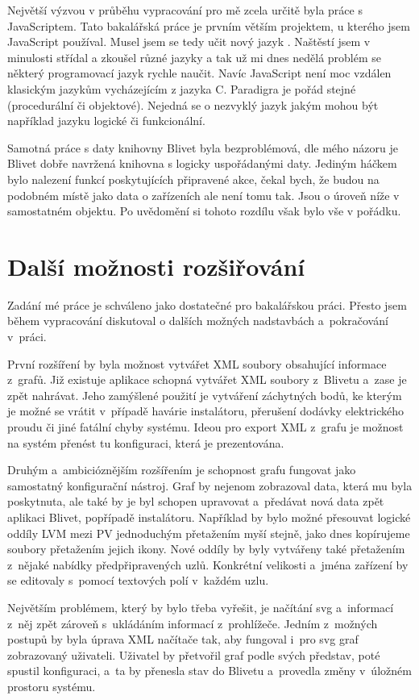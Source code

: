 \documentclass[color,table,oneside,nolot,nolof]{fithesis}
\begin{document}
	Největší výzvou v průběhu vypracování pro mě zcela určitě byla práce s JavaScriptem. Tato bakalářská práce je prvním větším projektem, u kterého jsem JavaScript používal. Musel jsem se
	tedy učit nový jazyk . Naštěstí jsem v minulosti střídal a zkoušel různé jazyky a tak už mi dnes nedělá problém se některý programovací jazyk rychle naučit. Navíc 
	JavaScript není moc vzdálen klasickým jazykům vycházejícím z jazyka C. Paradigra je pořád stejné (procedurální či objektové). Nejedná se o nezvyklý jazyk jakým mohou být například
	jazyku logické či funkcionální.

	Samotná práce s daty knihovny Blivet byla bezproblémová, dle mého názoru je Blivet dobře navržená knihovna s logicky uspořádanými daty. Jediným háčkem bylo nalezení funkcí poskytujících
	připravené akce, čekal bych, že budou na podobném místě jako data o zařízeních ale není tomu tak. Jsou o úroveň níže v samostatném objektu. Po uvědomění si tohoto rozdílu však bylo vše
	v pořádku.
  
\section{Další možnosti rozšiřování}
	Zadání mé práce je schváleno jako dostatečné pro bakalářskou práci. Přesto jsem během vypracování diskutoval o dalších možných nadstavbách a~pokračování v~práci.

	První rozšíření by byla možnost vytvářet XML soubory obsahující informace z~grafů. Již existuje aplikace schopná vytvářet XML soubory z~Blivetu a~zase je zpět nahrávat. Jeho zamýšlené
	použití je vytváření záchytných bodů, ke kterým je možné se vrátit v~případě havárie instalátoru, přerušení dodávky elektrického proudu či jiné fatální chyby systému. Ideou pro export
	XML z~grafu je možnost na systém přenést tu konfiguraci, která je prezentována.

	Druhým a~ambicióznějším rozšířením je schopnost grafu fungovat jako samostatný konfigurační nástroj. Graf by nejenom zobrazoval data, která mu byla poskytnuta, ale také by je byl
	schopen upravovat a~předávat nová data zpět aplikaci Blivet, popřípadě instalátoru. Například by bylo možné přesouvat logické oddíly LVM mezi PV jednoduchým 
	přetažením myší stejně, jako dnes kopírujeme soubory přetažením jejich ikony. Nové oddíly by byly vytvářeny také přetažením z~nějaké nabídky předpřipravených uzlů. Konkrétní velikosti
	a~jména zařízení by se editovaly s~pomocí textových polí v~každém uzlu.
	
	Největším problémem, který by bylo třeba vyřešit, je načítání svg a~informací z~něj zpět zároveň s~ukládáním informací z~prohlížeče. 
	Jedním z~možných postupů by byla úprava XML načítače tak, aby fungoval i~pro svg graf zobrazovaný uživateli. Uživatel by přetvořil graf podle svých představ, poté spustil 
	konfiguraci, a~ta by přenesla stav do Blivetu a~provedla změny v~úložném prostoru systému. 

	\printbibliography
\end{document}
